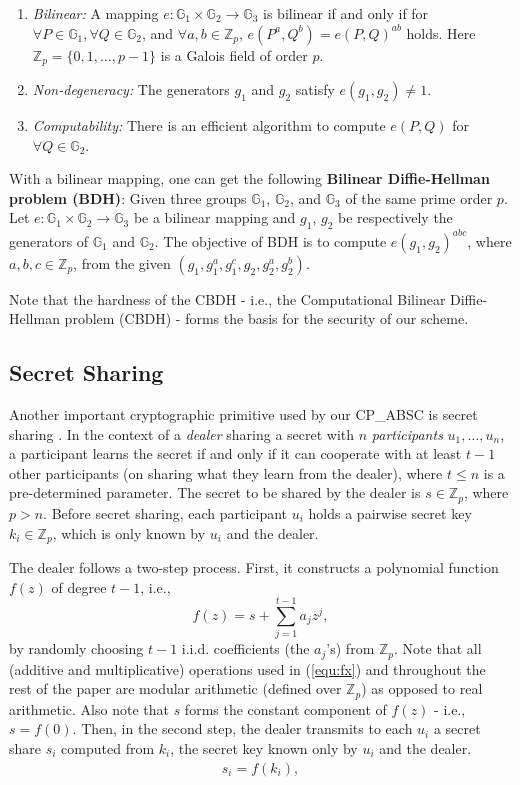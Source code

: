 \documentclass[letterpaper,12pt]{article}
\begin{document}
\begin{enumerate}
\item {\em Bilinear:} A mapping $e: \mathbb{G}_1\times \mathbb{G}_2\rightarrow \mathbb{G}_3$ is bilinear if and only if for $\forall P\in \mathbb{G}_1, \forall Q\in \mathbb{G}_2$, and $\forall a, b \in \mathbb{Z}_p$, $e(P^a,Q^b)=e(P,Q)^{ab}$ holds. Here $\mathbb{Z}_p = \{0, 1, \ldots, p-1\}$ is a Galois field of order $p$.
\item {\em Non-degeneracy:} The generators $g_1$ and $g_2$ satisfy $e(g_1,g_2)\neq 1$.
\item {\em Computability:} There is an efficient algorithm to compute $e(P,Q)$ for $\forall Q \in \mathbb{G}_2$.
\end{enumerate}

With a bilinear mapping, one can get the following {\bf Bilinear Diffie-Hellman problem (BDH)}:
 Given three groups $\mathbb{G}_1$, $\mathbb{G}_2$, and $\mathbb{G}_3$ of the same prime order $p$. Let $e: \mathbb{G}_1\times \mathbb{G}_2\rightarrow \mathbb{G}_3$ be a bilinear mapping and $g_1$, $g_2$ be respectively the generators of $\mathbb{G}_1$ and $\mathbb{G}_2$. The objective of BDH is to compute $e(g_1,g_2)^{abc}$, where $a,b,c\in \mathbb{Z}_p$, from the given $(g_1,g_1^a,g_1^c,g_2,g_2^a,g_2^b)$.

Note that the hardness of the CBDH - i.e., the Computational Bilinear Diffie-Hellman problem (CBDH) - forms the basis for the security of our scheme.


\subsection{Secret Sharing}

Another important cryptographic primitive used by our CP\_ABSC is secret sharing \cite{shamir1979share,HuVMSS12}. In the context of a {\em dealer} sharing a secret with $n$ {\em participants} $u_1, \ldots, u_n$, a participant learns the secret if and only if it can cooperate with at least $t - 1$ other participants (on sharing what they learn from the dealer), where $t \leq n$ is a pre-determined parameter. The secret to be shared by the dealer is $s \in \mathbb{Z}_p$, where $p> n$. Before secret sharing, each participant $u_i$ holds a pairwise secret key $k_i \in \mathbb{Z}_p$, which is only known by $u_i$ and the dealer.

The dealer follows a two-step process. First, it constructs a polynomial function $f(z)$ of degree $t-1$, i.e.,
\begin{equation}
f(z)=s+\sum_{j=1}^{t-1}a_jz^j, \label{equ:fx}
\end{equation}
by randomly choosing $t-1$ i.i.d. coefficients (the $a_j$'s) from $\mathbb{Z}_p$. Note that all (additive and multiplicative) operations used in (\ref{equ:fx}) and throughout the rest of the paper are modular arithmetic (defined over $\mathbb{Z}_p$) as opposed to real arithmetic. Also note that $s$ forms the constant component of $f(z)$ - i.e., $s = f(0)$. Then, in the second step, the dealer transmits to each $u_i$ a secret share $s_i$ computed from $k_i$, the secret key known only by $u_i$ and the dealer.
\begin{align}
s_i = f(k_i),
\end{align}
\end{document}

